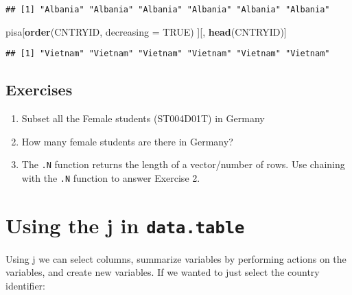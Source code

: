 \documentclass[]{book}
\newenvironment{Shaded}{\begin{snugshade}}{\end{snugshade}}
\newcommand{\DataTypeTok}[1]{\textcolor[rgb]{0.13,0.29,0.53}{#1}}
\newcommand{\KeywordTok}[1]{\textcolor[rgb]{0.13,0.29,0.53}{\textbf{#1}}}
\newcommand{\NormalTok}[1]{#1}
\newcommand{\OperatorTok}[1]{\textcolor[rgb]{0.81,0.36,0.00}{\textbf{#1}}}
\newcommand{\OtherTok}[1]{\textcolor[rgb]{0.56,0.35,0.01}{#1}}
\providecommand{\tightlist}{%
  \setlength{\itemsep}{0pt}\setlength{\parskip}{0pt}}
\begin{document}
\begin{Shaded}
\end{Shaded}

\begin{verbatim}
## [1] "Albania" "Albania" "Albania" "Albania" "Albania" "Albania"
\end{verbatim}

\begin{Shaded}
\begin{Highlighting}[]
\NormalTok{pisa[}\KeywordTok{order}\NormalTok{(CNTRYID, }\DataTypeTok{decreasing =} \OtherTok{TRUE}\NormalTok{)}
\NormalTok{     ][,}
       \KeywordTok{head}\NormalTok{(CNTRYID)]}
\end{Highlighting}
\end{Shaded}

\begin{verbatim}
## [1] "Vietnam" "Vietnam" "Vietnam" "Vietnam" "Vietnam" "Vietnam"
\end{verbatim}

\hypertarget{exercises-1}{%
\subsection{Exercises}\label{exercises-1}}

\begin{enumerate}
\def\labelenumi{\arabic{enumi}.}
\tightlist
\item
  Subset all the Female students (ST004D01T) in Germany
\item
  How many female students are there in Germany?
\item
  The \texttt{.N} function returns the length of a vector/number of rows. Use chaining with the \texttt{.N} function to answer Exercise 2.
\end{enumerate}

\hypertarget{using-the-j-in-data.table}{%
\section{\texorpdfstring{Using the j in \texttt{data.table}}{Using the j in data.table}}\label{using-the-j-in-data.table}}

Using j we can select columns, summarize variables by performing actions on the variables, and create new variables. If we wanted to just select the country identifier:
\end{document}
